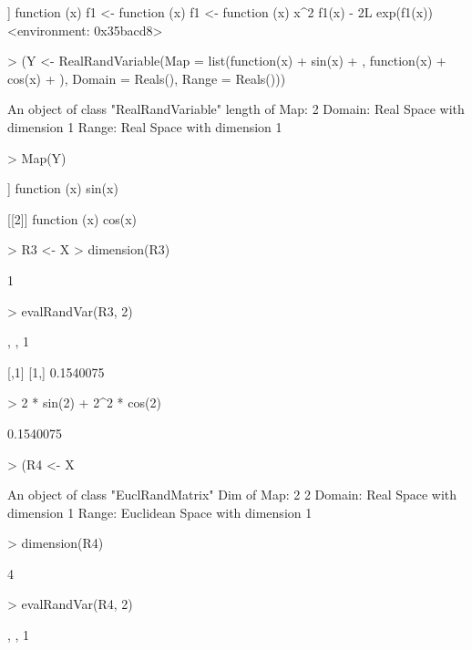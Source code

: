 \documentclass[11pt]{article}
\begin{document}
\begin{Schunk}
\begin{Soutput}
[[2]]
function (x) 
{
    f1 <- function (x) 
    {
        f1 <- function (x) 
        {
            x^2
        }
        f1(x) - 2L
    }
    exp(f1(x))
}
<environment: 0x35bacd8>
\end{Soutput}
\begin{Sinput}
> (Y <- RealRandVariable(Map = list(function(x) {
+     sin(x)
+ }, function(x) {
+     cos(x)
+ }), Domain = Reals(), Range = Reals()))
\end{Sinput}
\begin{Soutput}
An object of class "RealRandVariable" 
length of Map:	 2 
Domain:	Real Space with dimension 1 
Range:	Real Space with dimension 1 
\end{Soutput}
\begin{Sinput}
> Map(Y)
\end{Sinput}
\begin{Soutput}
[[1]]
function (x) 
{
    sin(x)
}

[[2]]
function (x) 
{
    cos(x)
}
\end{Soutput}
\begin{Sinput}
> R3 <- X %
> dimension(R3)
\end{Sinput}
\begin{Soutput}
[1] 1
\end{Soutput}
\begin{Sinput}
> evalRandVar(R3, 2)
\end{Sinput}
\begin{Soutput}
, , 1

          [,1]
[1,] 0.1540075
\end{Soutput}
\begin{Sinput}
> 2 * sin(2) + 2^2 * cos(2)
\end{Sinput}
\begin{Soutput}
[1] 0.1540075
\end{Soutput}
\begin{Sinput}
> (R4 <- X %
\end{Sinput}
\begin{Soutput}
An object of class "EuclRandMatrix" 
Dim of Map:	 2 2 
Domain:	Real Space with dimension 1 
Range:	Euclidean Space with dimension 1 
\end{Soutput}
\begin{Sinput}
> dimension(R4)
\end{Sinput}
\begin{Soutput}
[1] 4
\end{Soutput}
\begin{Sinput}
> evalRandVar(R4, 2)
\end{Sinput}
\begin{Soutput}
, , 1


\end{Soutput}
\end{Schunk}
\end{document}

